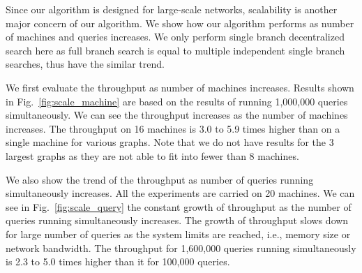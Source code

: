 Since our algorithm is designed for large-scale networks, scalability is another major concern of our algorithm. We show how our algorithm performs as number of machines and queries increases. We only perform single branch decentralized search here as full branch search is equal to multiple independent single branch searches, thus have the similar trend.

We first evaluate the throughput as number of machines increases. Results shown in Fig.~\ref{fig:scale_machine} are based on the results of running 1,000,000 queries simultaneously. We can see the throughput increases as the number of machines increases. The throughput on 16 machines is 3.0 to 5.9 times higher than on a single machine for various graphs. Note that we do not have results for the 3 largest graphs as they are not able to fit into fewer than 8 machines.

We also show the trend of the throughput as number of queries running simultaneously increases. All the experiments are carried on 20 machines. We can see in Fig.~\ref{fig:scale_query} the constant growth of throughput as the number of queries running simultaneously increases. The growth of throughput slows down for large number of queries as the system limits are reached, i.e., memory size or network bandwidth. The throughput for 1,600,000 queries running simultaneously is 2.3 to 5.0 times higher than it for 100,000 queries.
